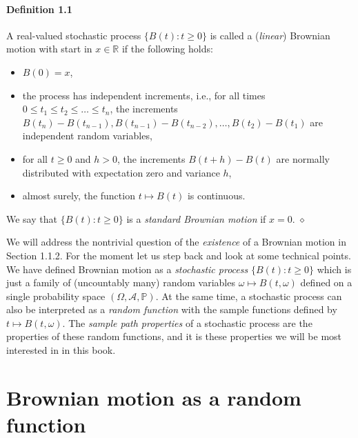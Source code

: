 \documentclass{article}
\begin{document}
\paragraph{Definition 1.1} A real-valued stochastic process $\{B(t) : t \geq 0\}$ is called a (\textit{linear}) Brownian motion with start in $x \in \mathbb{R}$ if the following holds:
\begin{itemize}
    \item $B(0) = x$,
    \item the process has independent increments, i.e., for all times $0 \leq t_1 \leq t_2 \leq \dots \leq t_n$, the increments $B(t_n) - B(t_{n-1}), B(t_{n-1}) - B(t_{n-2}), \ldots, B(t_2) - B(t_1)$ are independent random variables,
    \item for all $t \geq 0$ and $h > 0$, the increments $B(t+h) - B(t)$ are normally distributed with expectation zero and variance $h$,
    \item almost surely, the function $t \mapsto B(t)$ is continuous.
\end{itemize}

We say that $\{B(t) : t \geq 0\}$ is a \textit{standard Brownian motion} if $x = 0$. \hfill $\diamond$

We will address the nontrivial question of the \textit{existence} of a Brownian motion in Section 1.1.2. For the moment let us step back and look at some technical points. We have defined Brownian motion as a \textit{stochastic process} $\{B(t) : t \geq 0\}$ which is just a family of (uncountably many) random variables $\omega \mapsto B(t, \omega)$ defined on a single probability space $(\Omega, \mathcal{A}, \mathbb{P})$. At the same time, a stochastic process can also be interpreted as a \textit{random function} with the sample functions defined by $t \mapsto B(t, \omega)$. The \textit{sample path properties} of a stochastic process are the properties of these random functions, and it is these properties we will be most interested in in this book.




\section*{Brownian motion as a random function}

\end{document}
